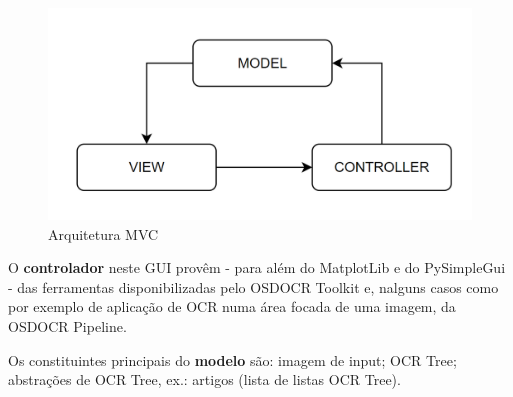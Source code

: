 \begin{figure}[H]
	\centering
	\includegraphics[width=1\textwidth]{images/diagramas/MVC.png}
	\caption{Arquitetura MVC}
	\label{fig:arquitetura_mvc}
\end{figure}

O \textbf{controlador} neste GUI provêm - para além do MatplotLib e do PySimpleGui - das ferramentas disponibilizadas pelo OSDOCR Toolkit e, nalguns casos como por exemplo de aplicação de OCR numa área focada de uma imagem, da OSDOCR Pipeline.

Os constituintes principais do \textbf{modelo} são: imagem de input; OCR Tree; abstrações de OCR Tree, ex.: artigos (lista de listas OCR Tree).








